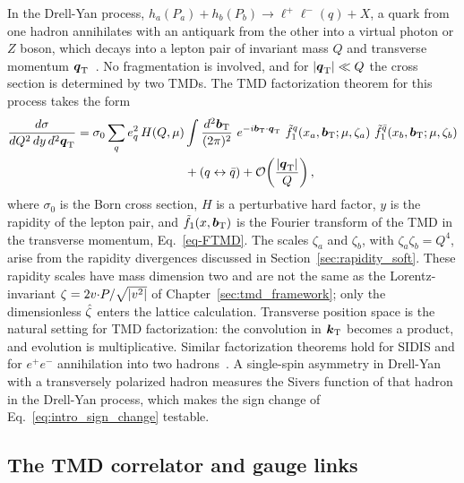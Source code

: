 In the Drell-Yan process, $h_a(P_a) + h_b(P_b) \to \ell^+\ell^-(q) + X$, a quark from one hadron annihilates with an antiquark from the other into a virtual photon or $Z$ boson, which decays into a lepton pair of invariant mass $Q$ and transverse momentum $\boldsymbol{q}_{\mathrm T}$~\cite{Drell:1970wh}. No fragmentation is involved, and for $|\boldsymbol{q}_{\mathrm T}|\ll Q$ the cross section is determined by two TMDs. The TMD factorization theorem for this process takes the form~\cite{Collins:1984kg,CollinsBook2011,Boussarie:2023izj}
\begin{equation}
  \begin{split}
  \frac{d\sigma}{dQ^2\,dy\,d^2\vprp{q}} = \sigma_0 \sum_q e_q^2\, H(Q,\mu)&\int\frac{d^2\vprp{b}}{(2\pi)^2}\ e^{-i\vprp{b}\tcdot\vprp{q}}\ \tilde{f}_1^{q}(x_a,\vprp{b};\mu,\zeta_a)\ \tilde{f}_1^{\bar q}(x_b,\vprp{b};\mu,\zeta_b)\\
  &+ (q\leftrightarrow\bar q) + \mathcal{O}\!\left(\frac{|\vprp{q}|}{Q}\right) ,
  \end{split}
  \label{eq:dy_factorization}
\end{equation}
where $\sigma_0$ is the Born cross section, $H$ is a perturbative hard factor, $y$ is the rapidity of the lepton pair, and $\tilde f_1(x,\boldsymbol{b}_{\mathrm T})$ is the Fourier transform of the TMD in the transverse momentum, Eq.~\eqref{eq-FTMD}. The scales $\zeta_a$ and $\zeta_b$, with $\zeta_a\zeta_b = Q^4$, arise from the rapidity divergences discussed in Section~\ref{sec:rapidity_soft}. These rapidity scales have mass dimension two and are not the same as the Lorentz-invariant $\zeta = 2v{\cdot} P/\sqrt{|v^2|}$ of Chapter~\ref{sec:tmd_framework}; only the dimensionless ${\hat \zeta}$ enters the lattice calculation. Transverse position space is the natural setting for TMD factorization: the convolution in $\boldsymbol{k}_{\mathrm T}$ becomes a product, and evolution is multiplicative. Similar factorization theorems hold for SIDIS and for $e^+e^-$ annihilation into two hadrons~\cite{Ji:2004wu,CollinsBook2011}. A single-spin asymmetry in Drell-Yan with a transversely polarized hadron measures the Sivers function of that hadron in the Drell-Yan process, which makes the sign change of Eq.~\eqref{eq:intro_sign_change} testable.

\subsection{The TMD correlator and gauge links}
\label{sec:tmd_gauge_links}

